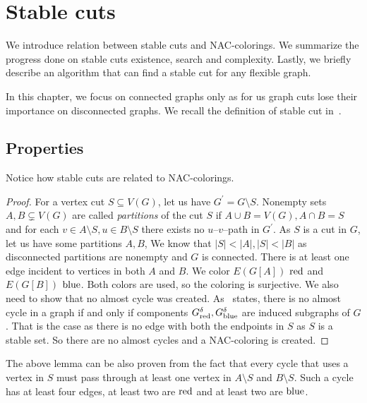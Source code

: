 
\chapter{Stable cuts}%
\label{chapter:stable_cuts}

\begin{chapterabstract}
	We introduce relation between stable cuts and NAC-colorings.
	We summarize the progress done on stable cuts existence, search and complexity.
	Lastly, we briefly describe an algorithm that can find a stable cut
	for any flexible graph.
\end{chapterabstract}


In this chapter, we focus on connected graphs only as for us graph cuts
lose their importance on disconnected graphs.
We recall the definition of
stable cut in~.

\section{Properties}

Notice how stable cuts are related to NAC-colorings.
%
%
\begin{proof}
	For a vertex cut \( S \subseteq V(G) \), let us have \( G^\prime = G \setminus S \).
	Nonempty sets \( A, B \subsetneq V(G) \) are called \emph{partitions} of the cut \( S \)
	if \( A \cup B = V(G), A \cap B = S \) and for each \( v \in A \setminus S, u \in B \setminus S \)
	there exists no \( u \)--\( v \)--path in \( G^\prime \).
	As \( S \) is a cut in \( G \), let us have some partitions \( A, B \),
	We know that \( |S| < |A|, |S| < |B| \)
	as disconnected partitions are nonempty and \( G \) is connected.
	There is at least one edge incident to vertices in both \( A \) and \( B \).
	We color \( E(G[A]) \) \( \text{red} \) and \( E(G[B]) \) \( \text{blue} \).
	Both colors are used, so the coloring is surjective.
	We also need to show that no almost cycle was created.
	As~
	states, there is no almost cycle in a graph if and only
	if components \( G_{\text{red}}^\delta, G_{\text{blue}}^\delta \)
	are induced subgraphs of \( G \).
	That is the case as there is no edge with both the endpoints in \( S \)
	as \( S \) is a stable set.
	So there are no almost cycles and a NAC-coloring is created.
\end{proof}
%
The above lemma can be also proven from the fact that every cycle that
uses a vertex in \( S \) must pass
through at least one vertex in \( A \setminus S \) and \( B \setminus S \).
Such a cycle has at least four edges,
at least two are \( \text{red} \) and at least two are \( \text{blue} \).


